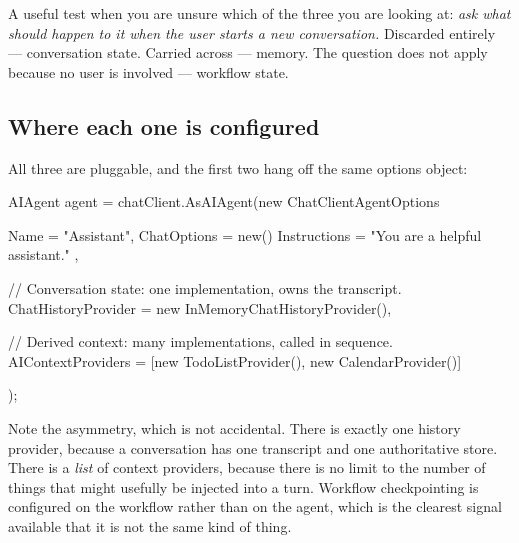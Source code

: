 \begin{note}
A useful test when you are unsure which of the three you are looking at:
\emph{ask what should happen to it when the user starts a new conversation.}
Discarded entirely --- conversation state. Carried across --- memory. The
question does not apply because no user is involved --- workflow state.
\end{note}

\subsection{Where each one is configured}

All three are pluggable, and the first two hang off the same options object:

\begin{csharp}[caption={The two agent-level extension points}, label={lst:state-options}]
AIAgent agent = chatClient.AsAIAgent(new ChatClientAgentOptions
{
    Name = "Assistant",
    ChatOptions = new() { Instructions = "You are a helpful assistant." },

    // Conversation state: one implementation, owns the transcript.
    ChatHistoryProvider = new InMemoryChatHistoryProvider(),

    // Derived context: many implementations, called in sequence.
    AIContextProviders = [new TodoListProvider(), new CalendarProvider()]
});
\end{csharp}

Note the asymmetry, which is not accidental. There is exactly one history
provider, because a conversation has one transcript and one authoritative store.
There is a \emph{list} of context providers, because there is no limit to the
number of things that might usefully be injected into a turn. Workflow
checkpointing is configured on the workflow rather than on the agent, which is
the clearest signal available that it is not the same kind of thing.


